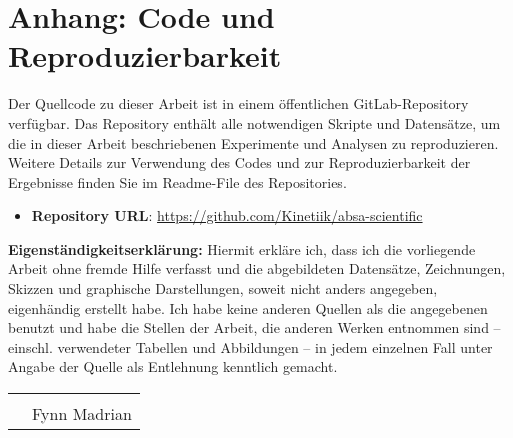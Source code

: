 \documentclass[12pt]{article}
\begin{document}
\section*{Anhang: Code und Reproduzierbarkeit}

Der Quellcode zu dieser Arbeit ist in einem öffentlichen GitLab-Repository verfügbar. Das Repository enthält alle notwendigen Skripte und Datensätze, um die in dieser Arbeit beschriebenen Experimente und Analysen zu reproduzieren. Weitere Details zur Verwendung des Codes und zur Reproduzierbarkeit der Ergebnisse finden Sie im Readme-File des Repositories.

\begin{itemize}
    \item \textbf{Repository URL}: \url{https://github.com/Kinetiik/absa-scientific}
\end{itemize}


\newpage
\textbf{Eigenständigkeitserklärung:}
\newline
\newline
Hiermit erkläre ich, dass ich die vorliegende Arbeit ohne fremde Hilfe verfasst und die abgebildeten Datensätze,
Zeichnungen, Skizzen und graphische Darstellungen, soweit nicht anders angegeben, eigenhändig erstellt habe.
Ich habe keine anderen Quellen als die angegebenen benutzt und habe die Stellen der Arbeit, die anderen
Werken entnommen sind – einschl. verwendeter Tabellen und Abbildungen – in jedem einzelnen Fall unter
Angabe der Quelle als Entlehnung kenntlich gemacht.
\newline
\newline
\newline
\newline
\begin{tabular}{@{}p{.5in}p{4in}@{}}
& \hrulefill \\
& Fynn Madrian\\
\end{tabular}
\end{document}

